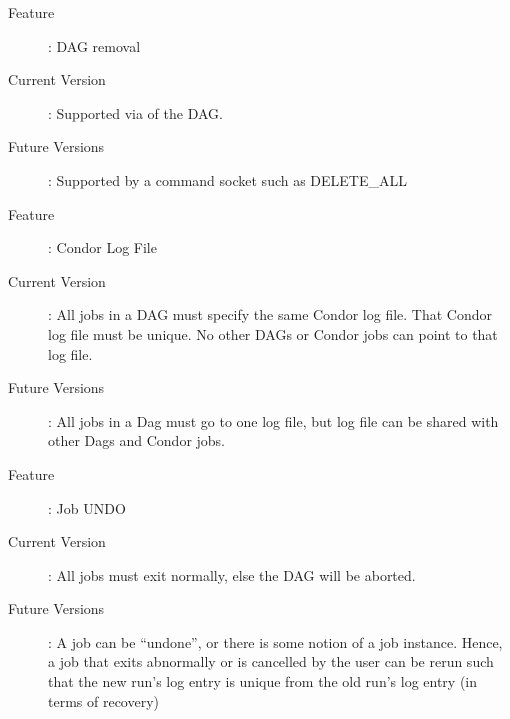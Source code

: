 \begin{description}
\item[Feature]: DAG removal
\item[Current Version]: Supported via  of the DAG.
\item[Future Versions]: Supported by a command socket such as DELETE\_ALL
\end{description}

\begin{description}
\item[Feature]: Condor Log File
\item[Current Version]: All jobs in a DAG must specify the same Condor log
file.  That Condor log file must be unique.  No other DAGs or Condor jobs can
point to that log file.
\item[Future Versions]: All jobs in a Dag must go to one log file, but
log file can be shared with other Dags and Condor jobs.
\end{description}

\begin{description}
\item[Feature]: Job UNDO
\item[Current Version]: All jobs must exit normally, else the DAG will be
aborted.
\item[Future Versions]: A job can be ``undone'', or there is some
notion of a job instance.  Hence, a job that exits abnormally or is
cancelled by the user can be rerun such that the new run's log entry
is unique from the old run's log entry (in terms of recovery)
\end{description}

